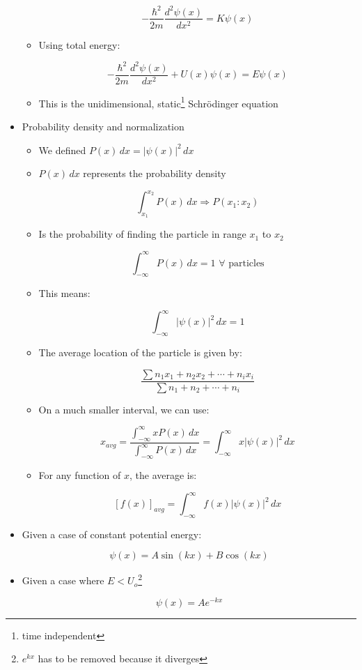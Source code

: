 \begin{itemize}
\begin{itemize}
        $$\boxed{-\frac{\hbar^2}{2m}\frac{d^2\psi(x)}{dx^2}=K\psi(x)}$$

      \item Using total energy:

        $$\boxed{-\frac{\hbar^2}{2m}\frac{d^2\psi(x)}{dx^2}+U(x)\psi(x)=E\psi(x)}$$

      \item This is the unidimensional, static\footnote{time independent} Schr\"odinger equation

    \end{itemize}

  \item Probability density and normalization

    \begin{itemize}

      \item We defined $P(x)\,dx=|\psi(x)|^2\,dx$

      \item $P(x)\,dx$ represents the probability density


        $$\int_{x_1}^{x_2} P(x)\,dx\Rightarrow P(x_1:x_2)$$

      \item Is the probability of finding the particle in range $x_1$ to $x_2$

        $$\int_{-\infty}^{\infty}P(x)\,dx=1\,\,\forall\text{ particles}$$

      \item This means:

        $$\boxed{\int_{-\infty}^{\infty} |\psi(x)|^2\,dx = 1}$$

      \item The average location of the particle is given by:

        $$\boxed{\dfrac{\sum n_1x_1+n_2x_2+\cdots+n_ix_i}{\sum n_1+n_2+\cdots+n_i}}$$

      \item On a much smaller interval, we can use:

        $$x_{avg}=\dfrac{\displaystyle \int_{-\infty}^{\infty} xP(x)\,dx}{\displaystyle \int_{-\infty}^{\infty} P(x)\,dx}=\int_{-\infty}^{\infty} x|\psi(x)|^2\,dx$$

      \item For any function of $x$, the average is:

        $$[f(x)]_{avg}=\int_{-\infty}^{\infty}f(x)|\psi(x)|^2\,dx$$

    \end{itemize}

  \item Given a case of constant potential energy:

    $$\psi(x)=A\sin(kx)+B\cos(kx)$$

  \item Given a case where $E < U_o$\footnote{$e^{kx}$ has to be removed because it diverges}

    $$\psi(x)=Ae^{-kx}$$

\end{itemize}




